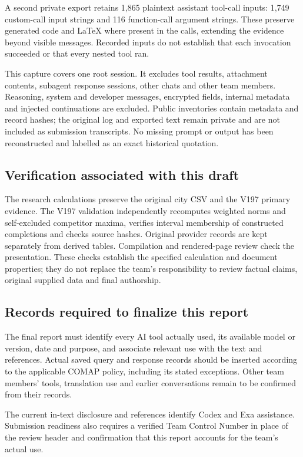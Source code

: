 A second private export retains 1,865 plaintext assistant tool-call inputs:
1,749 custom-call input strings and 116 function-call argument strings.
These preserve generated code and LaTeX where present in the calls, extending
the evidence beyond visible messages. Recorded inputs do not establish that
each invocation succeeded or that every nested tool ran.

This capture covers one root session. It excludes tool results, attachment
contents, subagent response sessions, other chats and other team members.
Reasoning, system and developer messages, encrypted fields, internal metadata
and injected continuations are excluded. Public inventories contain metadata
and record hashes; the original log and exported text remain private and are
not included as submission transcripts. No missing prompt or output has been
reconstructed and labelled as an exact historical quotation.

\subsection*{Verification associated with this draft}
The research calculations preserve the original city CSV and the V197 primary
evidence. The V197 validation independently recomputes weighted norms and
self-excluded competitor maxima, verifies interval membership of constructed
completions and checks source hashes. Original provider records are kept
separately from derived tables. Compilation and rendered-page review check the
presentation. These checks establish the specified calculation and document
properties; they do not replace the team's responsibility to review factual
claims, original supplied data and final authorship.

\subsection*{Records required to finalize this report}
The final report must identify every AI tool actually used, its available
model or version, date and purpose, and associate relevant use with the text
and references. Actual saved query and response records should be inserted
according to the applicable COMAP policy, including its stated exceptions.
Other team members' tools, translation use and earlier conversations remain
to be confirmed from their records.

The current in-text disclosure and references identify Codex and Exa
assistance. Submission readiness also requires a verified Team Control Number
in place of the review header and confirmation that this report accounts for
the team's actual use.
